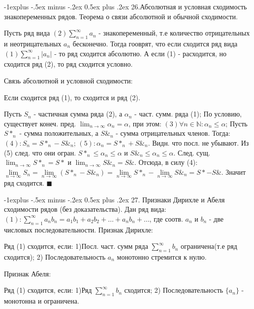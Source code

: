 \documentclass[unicode,10pt, landscape]{article}
\makeatletter
\renewcommand{\subsection}{\@startsection{subsection}{2}{0mm}%
                                {-1explus -.5ex minus -.2ex}%
                                {0.5ex plus .2ex}%
                                {\normalfont\normalsize\bfseries}}
\newenvironment{Proof} %
{\par\noindent{\bf Док-во:}} %
{\hfill$\scriptstyle\blacksquare$}
\makeatother
\begin{document}
\begin{multicols}{4}
 \subsection{26.Абсолютная и условная сходимость знакопеременных рядов. Теорема о связи абсолютной и обычной сходимости.}
 \begin{Def}
  Пусть ряд вида $(2) \sum_{n=1}^\infty a_n$ - знакопеременный, т.е количество отрицательных и неотрицательных $a_n$ бесконечно. Тогда гооврят, что если сходится ряд вида $(1) \sum_{n=1}^\infty |a_n|$ - то ряд сходится абсолютно. А если (1) - расходится, но сходится ряд (2), то ряд сходится условно.
 \end{Def}
 Связь абсолютной и условной сходимости:
 \begin{Th}
  Если сходится ряд (1), то сходится и ряд (2).
  \begin{Proof}
   Пусть $S_n$ - частичная сумма ряда (2), а $\alpha_n$ - част. сумм. ряда (1); По условию, существует конеч. пред. $\lim_{n \to \infty} \alpha_n = \alpha$, при этом: $(3)\forall n \in \mathbb{N}: \alpha_n \leq \alpha$; Пусть $S*_n$ - сумма положительных, а $S\&_n$ - сумма отрицательных членов. Тогда: $(4): S_n = S*_n - S\&_n$; $(5): \alpha_n = S*_n + S\&_n$. Видн. что посл. не убывают. Из (5) след. что они огран. $S*_n \leq \alpha_n \leq \alpha$ и $S\&_n \leq \alpha_n \leq \alpha$. След. сущ. $\lim_{n \to \infty} S*_n = S*$ и $\lim_{n \to \infty} S\&_n = S\&$. Отсюда, в силу (4):$\lim\limits_{n\rightarrow\infty }S_{n}=\lim\limits_{n\rightarrow\infty }(S*_{n}-S\&_{n})=\lim\limits_{n\rightarrow\infty }S*_{n}-\lim\limits_{n\rightarrow\infty }S\&_{n}=S*-S\&$. Значит ряд сходится.
  \end{Proof}
 \end{Th}
 \subsection{27. Признаки Дирихле и Абеля сходимости рядов (без доказательства).}
 Дан ряд вида: $(1): \sum\limits_{n=1}^{\infty}a_{n}b_{n}=a_{1}b_{1}+a_{2}b_{2}+…+a_{n}b_{n}+…$, где соотв. $a_n$ и $b_n$ - две числовых последовательности.
 Признак Дирихле:
 \begin{Th}
  Ряд (1) сходится, если: 1)Посл. част. сумм ряда $\sum_{n=1}^\infty b_n$ ограничена(т.е ряд сходится);
  2) Последовательность $a_n$ монотонно стремится к нулю.
 \end{Th}
 Признак Абеля:
 \begin{Th}
  Ряд (1) сходится, если: 1)Ряд $\sum_{n=1}^\infty b_n$ сходится; 2) Последовательность $\{a_n\}$ - монотонна и ограничена.
 \end{Th}

\end{multicols}
\end{document}
